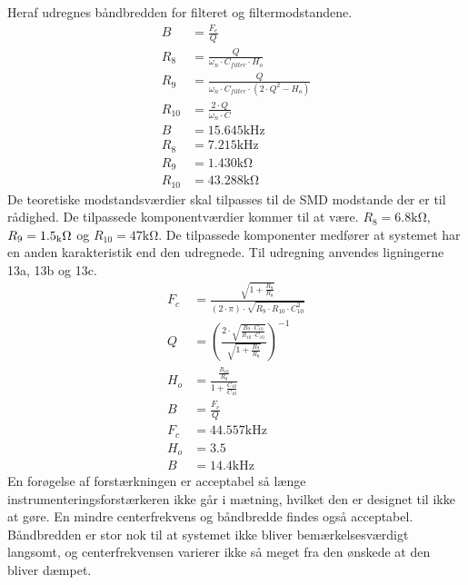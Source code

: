 Heraf udregnes båndbredden for filteret og filtermodstandene. \cite[Side. 209]{Huelsman1993}
\begin{align}
	B & = \frac{F_c}{Q} \\
	R_8 & = \frac{Q}{\omega_n \cdot C_{filter} \cdot H_o } \\
	R_9 & = \frac{Q}{ \omega_n \cdot C_{filter} \cdot \left( 2 \cdot Q^2 - H_o \right) } \\
	R_{10} & = \frac{2 \cdot Q}{ \omega_n \cdot C} \\
	B & = 15.645 \si{\kilo\hertz} \nonumber \\
	R_8 & = 7.215 \si{\kilo\hertz} \nonumber \\
	R_9 & = 1.430 \si{\kilo\ohm} \nonumber \\
	R_{10} & = 43.288 \si{\kilo\ohm} \nonumber 
\end{align}
De teoretiske modstandsværdier skal tilpasses til de SMD modstande der er til rådighed.
De tilpassede komponentværdier kommer til at være. $R_8 = 6.8 \si{\kilo\ohm}$, $R_9 = 1.5 \si{_\kilo\ohm}$ og $R_{10} = 47 \si{\kilo\ohm}$.
De tilpassede komponenter medfører at systemet har en anden karakteristik end den udregnede. 
Til udregning anvendes ligningerne 13a, 13b og 13c. \cite[Side. 208]{Huelsman1993}
\begin{align}
	F_c & = \frac{\sqrt{1+\frac{R_9}{R_8}}}{\left( 2 \cdot \pi \right) \cdot \sqrt{R_9 \cdot R_{10} \cdot C_{10}^2}} \\
	Q & = \left( \frac{2 \cdot \sqrt{\frac{R_9 \cdot C_{10}}{R_{10} \cdot C_{10}}}}{\sqrt{1+\frac{R_9}{R_8}}} \right)^{-1} \\
	H_o & = \frac{\frac{R_{10}}{R_8}}{1+\frac{C_{10}}{C_{10}}} \\
	B & = \frac{F_c}{Q} \\
	F_c & = 44.557 \si{\kilo\hertz} \nonumber \\
	H_o & = 3.5 \nonumber \\
	B & = 14.4 \si{\kilo\hertz} \nonumber
\end{align}
En forøgelse af forstærkningen er acceptabel så længe instrumenteringsforstærkeren ikke går i mætning, hvilket den er designet til ikke at gøre. 
En mindre centerfrekvens og båndbredde findes også acceptabel. 
Båndbredden er stor nok til at systemet ikke bliver bemærkelsesværdigt langsomt, og centerfrekvensen varierer ikke så meget fra den ønskede at den bliver dæmpet.
